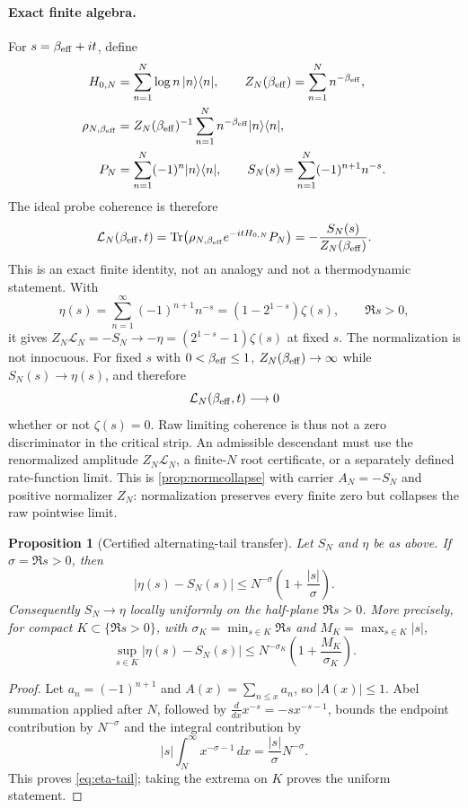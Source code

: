 \documentclass[11pt,a4paper]{article}
\theoremstyle{definition}
\theoremstyle{plain}
\newtheorem{proposition}[definition]{Proposition}
\theoremstyle{remark}
\newcommand{\Tr}{\operatorname{Tr}}
\begin{document}
\paragraph{Exact finite algebra.}
For \(s=\beta_{\rm eff}+it\), define
\[
\begin{split}
 H_{0,N}&=\sum_{n=1}^{N}\log n\,|n\rangle\langle n|,\qquad
 Z_N(\beta_{\rm eff})=\sum_{n=1}^{N}n^{-\beta_{\rm eff}},\\
 \rho_{N,\beta_{\rm eff}}
 &=Z_N(\beta_{\rm eff})^{-1}
   \sum_{n=1}^{N}n^{-\beta_{\rm eff}}|n\rangle\langle n|,\\
 P_N&=\sum_{n=1}^{N}(-1)^n|n\rangle\langle n|,\qquad
 S_N(s)=\sum_{n=1}^{N}(-1)^{n+1}n^{-s}.
\end{split}
\]
The ideal probe coherence is therefore
\begin{equation}\label{eq:zdq-finite}
 \mathcal L_N(\beta_{\rm eff},t)
 =\Tr\!\left(\rho_{N,\beta_{\rm eff}}e^{-itH_{0,N}}P_N\right)
 =-\frac{S_N(s)}{Z_N(\beta_{\rm eff})}.
\end{equation}
This is an exact finite identity, not an analogy and not a thermodynamic
statement.  With
\[
 \eta(s)=\sum_{n=1}^{\infty}(-1)^{n+1}n^{-s}
       =(1-2^{1-s})\zeta(s),\qquad \Re s>0,
\]
it gives \(Z_N\mathcal L_N=-S_N\to-\eta
=(2^{1-s}-1)\zeta(s)\) at fixed \(s\).
The normalization is not innocuous.  For fixed \(s\) with
\(0<\beta_{\rm eff}\leq1\), \(Z_N(\beta_{\rm eff})\to\infty\) while
\(S_N(s)\to\eta(s)\), and therefore
\[
 \mathcal L_N(\beta_{\rm eff},t)\longrightarrow0
\]
whether or not \(\zeta(s)=0\).  Raw limiting coherence is thus not a
zero discriminator in the critical strip.  An admissible descendant must use
the renormalized amplitude \(Z_N\mathcal L_N\), a finite-\(N\) root certificate,
or a separately defined rate-function limit.
This is \cref{prop:normcollapse} with carrier \(A_N=-S_N\) and positive
normalizer \(Z_N\): normalization preserves every finite zero but collapses
the raw pointwise limit.

\begin{proposition}[Certified alternating-tail transfer]
\label{prop:eta-tail}
Let \(S_N\) and \(\eta\) be as above.  If
\(\sigma=\Re s>0\), then
\begin{equation}\label{eq:eta-tail}
 |\eta(s)-S_N(s)|
 \le N^{-\sigma}\left(1+\frac{|s|}{\sigma}\right).
\end{equation}
Consequently \(S_N\to\eta\) locally uniformly on the half-plane
\(\Re s>0\).  More precisely, for compact
\(K\subset\{\Re s>0\}\), with
\(\sigma_K=\min_{s\in K}\Re s\) and \(M_K=\max_{s\in K}|s|\),
\[
 \sup_{s\in K}|\eta(s)-S_N(s)|
 \le N^{-\sigma_K}\left(1+\frac{M_K}{\sigma_K}\right).
\]
\end{proposition}
\begin{proof}
Let \(a_n=(-1)^{n+1}\) and \(A(x)=\sum_{n\le x}a_n\), so
\(|A(x)|\le1\).  Abel summation applied after \(N\), followed by
\(\frac{d}{dx}x^{-s}=-s x^{-s-1}\), bounds the endpoint contribution by
\(N^{-\sigma}\) and the integral contribution by
\[
 |s|\int_N^\infty x^{-\sigma-1}\,dx
 =\frac{|s|}{\sigma}N^{-\sigma}.
\]
This proves \eqref{eq:eta-tail}; taking the extrema on \(K\) proves the
uniform statement.
\end{proof}
\end{document}

